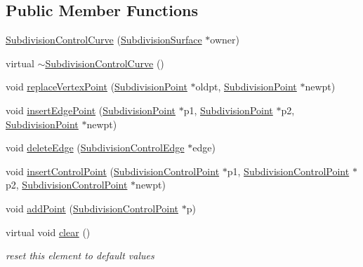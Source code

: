 \subsection*{Public Member Functions}
\begin{DoxyCompactItemize}
\item 
\hyperlink{classShipCAD_1_1SubdivisionControlCurve_adfdaa3dcd794901f3c1277223eab22f9}{Subdivision\-Control\-Curve} (\hyperlink{classShipCAD_1_1SubdivisionSurface}{Subdivision\-Surface} $\ast$owner)
\item 
virtual \hyperlink{classShipCAD_1_1SubdivisionControlCurve_a5b3d3e0b700afd7a7a1da0e5dfafdfb9}{$\sim$\-Subdivision\-Control\-Curve} ()
\item 
void \hyperlink{classShipCAD_1_1SubdivisionControlCurve_a078fc8820a6c0e37c475eec1897b13dd}{replace\-Vertex\-Point} (\hyperlink{classShipCAD_1_1SubdivisionPoint}{Subdivision\-Point} $\ast$oldpt, \hyperlink{classShipCAD_1_1SubdivisionPoint}{Subdivision\-Point} $\ast$newpt)
\item 
void \hyperlink{classShipCAD_1_1SubdivisionControlCurve_a0764f5d7697b76ac928a121d224733f5}{insert\-Edge\-Point} (\hyperlink{classShipCAD_1_1SubdivisionPoint}{Subdivision\-Point} $\ast$p1, \hyperlink{classShipCAD_1_1SubdivisionPoint}{Subdivision\-Point} $\ast$p2, \hyperlink{classShipCAD_1_1SubdivisionPoint}{Subdivision\-Point} $\ast$newpt)
\item 
void \hyperlink{classShipCAD_1_1SubdivisionControlCurve_abfed48331919c4d2a2bfc6363b28ebb4}{delete\-Edge} (\hyperlink{classShipCAD_1_1SubdivisionControlEdge}{Subdivision\-Control\-Edge} $\ast$edge)
\item 
void \hyperlink{classShipCAD_1_1SubdivisionControlCurve_a9469b178a88269d0f9ee3b17d5f15272}{insert\-Control\-Point} (\hyperlink{classShipCAD_1_1SubdivisionControlPoint}{Subdivision\-Control\-Point} $\ast$p1, \hyperlink{classShipCAD_1_1SubdivisionControlPoint}{Subdivision\-Control\-Point} $\ast$p2, \hyperlink{classShipCAD_1_1SubdivisionControlPoint}{Subdivision\-Control\-Point} $\ast$newpt)
\item 
void \hyperlink{classShipCAD_1_1SubdivisionControlCurve_a1155b0abe401a7128369a589b6e6ac9c}{add\-Point} (\hyperlink{classShipCAD_1_1SubdivisionControlPoint}{Subdivision\-Control\-Point} $\ast$p)
\item 
virtual void \hyperlink{classShipCAD_1_1SubdivisionControlCurve_aa574f77f4abc5a8eef05e7cef7f8d8a2}{clear} ()
\begin{DoxyCompactList}\small\item\em reset this element to default values \end{DoxyCompactList}\item 

\end{DoxyCompactItemize}
